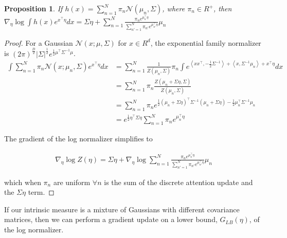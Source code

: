 \documentclass{article}
\newtheorem{proposition}{Proposition}
\begin{document}
\begin{proposition}
  If $h(x) = \sum_{n=1}^N \pi_n \mathcal{N}(\mu_n,\Sigma )$, where $\pi_n \in R^{+}$, then $\nabla_\eta \log \int h(x) e^{ x^\intercal \eta } dx = \Sigma \eta + \sum_{n=1}^N \frac{ \pi_n e^{\mu_n^\intercal \eta} }{ \sum_{n'=1}^N \pi_{n'} e^{ \mu_{n'}^\intercal \eta} } \mu_n$
  \label{rbf update}
\end{proposition}

\begin{proof}
  For a Gaussian $\mathcal{N}(x;\mu,\Sigma)$ for $x \in R^d$, the exponential family normalizer is $(2 \pi)^{\frac{D}{2}} \lvert \Sigma \rvert ^{\frac{1}{2}} e^{\frac{1}{2} \mu^\intercal \Sigma^{-1} \mu }$. \\
  \begin{equation}
    \begin{split}
      \int \sum_{n=1}^N \pi_n \mathcal{N}(x;\mu_n,\Sigma) e^{x^\intercal \eta} dx &= \sum_{n=1}^N \frac{1}{Z(\mu_n,\Sigma)} \pi_n \int e^{ \left< x x^\intercal, - \frac{1}{2} \Sigma^{-1} \right> + \left<x, \Sigma^{-1} \mu_n \right> + x^\intercal \eta} dx \\
      &= \sum_{n=1}^N \pi_n \frac{Z(\mu_n + \Sigma \eta,\Sigma)}{Z(\mu_n,\Sigma)} \\
      &= \sum_{n=1}^N \pi_n e^{\frac{1}{2} (\mu_n + \Sigma \eta)^\intercal \Sigma^{-1} (\mu_n + \Sigma \eta) - \frac{1}{2} \mu_n^\intercal \Sigma^{-1} \mu_n} \\
      &= e^{\frac{1}{2} \eta^\intercal \Sigma \eta} \sum_{n=1}^N \pi_n e^{\mu_n^\intercal \eta}
    \end{split}
    \label{rbf normalizer}
  \end{equation}

  The gradient of the log normalizer simplifies to

  \begin{equation}
    \begin{split}
      \nabla_\eta \log Z(\eta) = \Sigma \eta + \nabla_\eta \log \sum_{n=1}^N \frac{ \pi_n e^{\mu_n^\intercal \eta} }{ \sum_{n'=1}^N \pi_{n'} e^{\mu_{n'}^\intercal \eta }} \mu_n
    \end{split}
    \label{rbf update eq}
  \end{equation}

  which when $\pi_n$ are uniform $\forall n$ is the sum of the discrete attention update and the $\Sigma \eta$ term.
\end{proof}

If our intrinsic measure is a mixture of Gaussians with different covariance matrices, then we can perform a gradient update on a lower bound, $G_{LB}(\eta)$, of the log normalizer.
\end{document}
